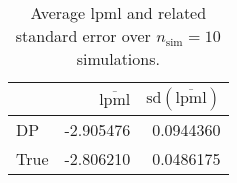 \begin{table}[H]

\caption{Average lpml and related standard error over $n_{\text{sim}} = 10$ simulations.}
\centering
\begin{tabular}[t]{lrr}
\toprule
  & $\overbar{\text{lpml}}$ & $\text{sd}(\overbar{\text{lpml}})$\\
\midrule
DP & -2.905476 & 0.0944360\\
True & -2.806210 & 0.0486175\\
\bottomrule
\end{tabular}
\end{table}